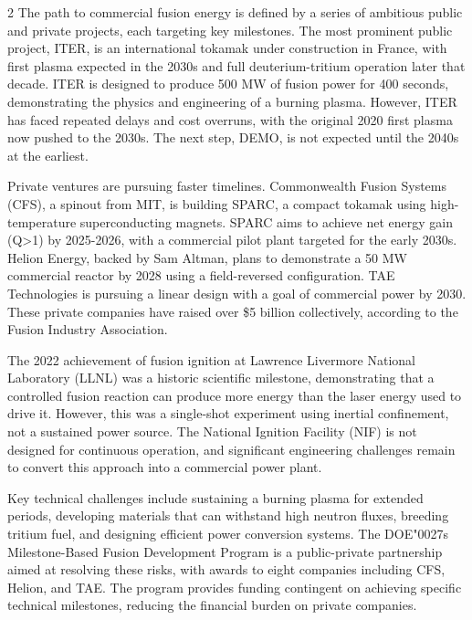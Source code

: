 \documentclass[10pt,a4paper]{article}
\newcommand{\BOApos}{{\BOQuoteFont\char"0027}}
\begin{document}
\begin{multicols}{2}
{\small The path to commercial fusion energy is defined by a series of ambitious public and private projects, each targeting key milestones. The most prominent public project, ITER, is an international tokamak under construction in France, with first plasma expected in the 2030s and full deuterium-tritium operation later that decade. ITER is designed to produce 500 MW of fusion power for 400 seconds, demonstrating the physics and engineering of a burning plasma. However, ITER has faced repeated delays and cost overruns, with the original 2020 first plasma now pushed to the 2030s. The next step, DEMO, is not expected until the 2040s at the earliest.}\par
{\small Private ventures are pursuing faster timelines. Commonwealth Fusion Systems (CFS), a spinout from MIT, is building SPARC, a compact tokamak using high-temperature superconducting magnets. SPARC aims to achieve net energy gain (Q>1) by 2025-2026, with a commercial pilot plant targeted for the early 2030s. Helion Energy, backed by Sam Altman, plans to demonstrate a 50 MW commercial reactor by 2028 using a field-reversed configuration. TAE Technologies is pursuing a linear design with a goal of commercial power by 2030. These private companies have raised over \$5 billion collectively, according to the Fusion Industry Association.}\par
{\small The 2022 achievement of fusion ignition at Lawrence Livermore National Laboratory (LLNL) was a historic scientific milestone, demonstrating that a controlled fusion reaction can produce more energy than the laser energy used to drive it. However, this was a single-shot experiment using inertial confinement, not a sustained power source. The National Ignition Facility (NIF) is not designed for continuous operation, and significant engineering challenges remain to convert this approach into a commercial power plant.}\par
{\small Key technical challenges include sustaining a burning plasma for extended periods, developing materials that can withstand high neutron fluxes, breeding tritium fuel, and designing efficient power conversion systems. The DOE\BOApos{}s Milestone-Based Fusion Development Program is a public-private partnership aimed at resolving these risks, with awards to eight companies including CFS, Helion, and TAE. The program provides funding contingent on achieving specific technical milestones, reducing the financial burden on private companies.}\par

\end{multicols}
\end{document}
